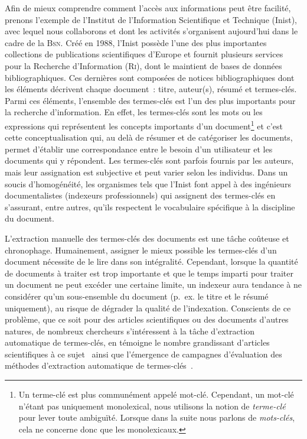       Afin de mieux comprendre comment l'accès aux informations peut être
      facilité, prenons l'exemple de l'Institut de l'Information Scientifique et
      Technique (Inist), avec lequel nous collaborons et dont les activités
      s'organisent aujourd'hui dans le cadre de la \textsc{Bsn}. Créé en 1988,
      l'Inist possède l'une des plus importantes collections de publications
      scientifiques d'Europe et fournit plusieurs services pour la Recherche
      d'Information (\textsc{Ri}), dont le maintient de bases de données
      bibliographiques. Ces dernières sont composées de notices bibliographiques
      dont les éléments décrivent chaque document~: titre, auteur(s), résumé et
      termes-clés. Parmi ces éléments, l'ensemble des termes-clés est l'un des
      plus importants pour la recherche d'information. En effet, les termes-clés
      sont les mots ou les expressions qui représentent les concepts importants
      d'un document\footnote{Un terme-clé est plus communément appelé mot-clé.
      Cependant, un mot-clé n'étant pas uniquement monolexical, nous utilisons
      la notion de \textit{terme-clé} pour lever toute ambiguïté. Lorsque dans
      la suite nous parlons de \textit{mots-clés}, cela ne concerne donc que les
      monolexicaux.} et c'est cette conceptualisation qui, au delà de résumer et
      de catégoriser les documents, permet d'établir une correspondance entre le
      besoin d'un utilisateur et les documents qui y répondent. Les termes-clés
      sont parfois fournis par les auteurs, mais leur assignation est subjective
      et peut varier selon les individus. Dans un soucis d'homogénéité, les
      organismes tels que l'Inist font appel à des ingénieurs documentalistes
      (indexeurs professionnels) qui assignent des termes-clés en s'assurant,
      entre autres, qu'ils respectent le vocabulaire spécifique à la discipline
      du document.

      L'extraction manuelle des termes-clés des documents est une tâche coûteuse
      et chronophage. Humainement, assigner le mieux possible les termes-clés
      d'un document nécessite de le lire dans son intégralité. Cependant,
      lorsque la quantité de documents à traiter est trop importante et que le
      temps imparti pour traiter un document ne peut excéder une certaine
      limite, un indexeur aura tendance à ne considérer qu'un sous-ensemble du
      document (p.~ex. le titre et le résumé uniquement), au risque de dégrader
      la qualité de l'indexation.
      Conscients de ce problème, que ce soit pour des articles
      scientifiques ou des documents d'autres natures, de nombreux chercheurs
      s'intéressent à la tâche d'extraction automatique de termes-clés, en
      témoigne le nombre grandissant d'articles scientifiques à ce
      sujet~\citep{hasan2014state_of_the_art} ainsi que l'émergence de campagnes
      d'évaluation des méthodes d'extraction automatique de
      termes-clés~\citep{kim2010semeval,paroubek2012deft}.

